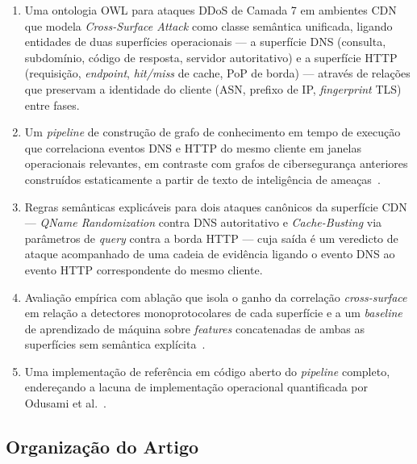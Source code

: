 \documentclass[preprint,12pt]{elsarticle}
\begin{document}
\begin{enumerate}
    \item Uma ontologia OWL para ataques DDoS de Camada 7 em ambientes CDN que modela \emph{Cross-Surface Attack} como classe semântica unificada, ligando entidades de duas superfícies operacionais --- a superfície DNS (consulta, subdomínio, código de resposta, servidor autoritativo) e a superfície HTTP (requisição, \emph{endpoint}, \emph{hit/miss} de cache, PoP de borda) --- através de relações que preservam a identidade do cliente (ASN, prefixo de IP, \emph{fingerprint} TLS) entre fases.

    \item Um \emph{pipeline} de construção de grafo de conhecimento em tempo de execução que correlaciona eventos DNS e HTTP do mesmo cliente em janelas operacionais relevantes, em contraste com grafos de cibersegurança anteriores construídos estaticamente a partir de texto de inteligência de ameaças~\cite{jia2018practical,bonagiri2024practical}.

    \item Regras semânticas explicáveis para dois ataques canônicos da superfície CDN --- \emph{QName Randomization} contra DNS autoritativo e \emph{Cache-Busting} via parâmetros de \emph{query} contra a borda HTTP --- cuja saída é um veredicto de ataque acompanhado de uma cadeia de evidência ligando o evento DNS ao evento HTTP correspondente do mesmo cliente.

    \item Avaliação empírica com ablação que isola o ganho da correlação \emph{cross-surface} em relação a detectores monoprotocolares de cada superfície e a um \emph{baseline} de aprendizado de máquina sobre \emph{features} concatenadas de ambas as superfícies sem semântica explícita~\cite{kemp2023approach,fernandes2015autonomous,bharathi2012pca}.

    \item Uma implementação de referência em código aberto do \emph{pipeline} completo, endereçando a lacuna de implementação operacional quantificada por Odusami et al.~\cite{odusami2020survey}.
\end{enumerate}

\subsection{Organização do Artigo}
\end{document}
